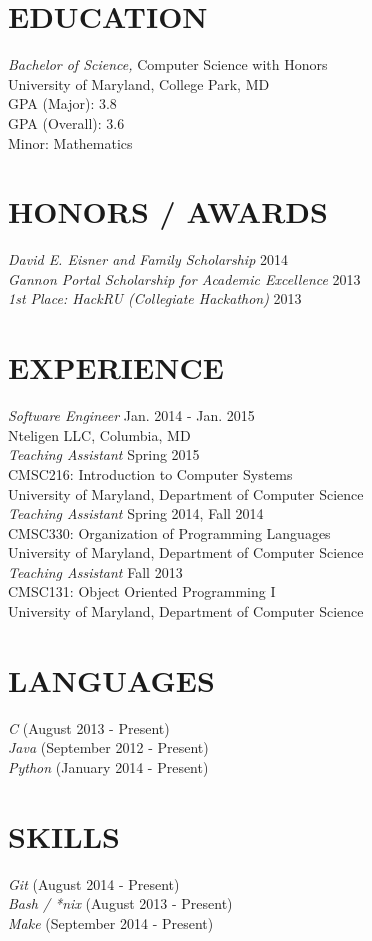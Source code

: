 \documentclass[margin]{res}
\begin{document}
\begin{resume}

\section{EDUCATION} {\sl Bachelor of Science,} Computer Science with Honors\\
	University of Maryland, College Park, MD \\
	GPA (Major): 3.8 \\
	GPA (Overall): 3.6 \\
	Minor: Mathematics \\
 
\section{HONORS / AWARDS} {\sl David E. Eisner and Family Scholarship } \hfill 2014 \\
	{\sl Gannon Portal Scholarship for Academic Excellence} \hfill 2013 \\
	{\sl 1st Place: HackRU (Collegiate Hackathon)} \hfill 2013 \\
 
\section{EXPERIENCE} {\sl Software Engineer} \hfill Jan. 2014 - Jan. 2015 \\
	Nteligen LLC, Columbia, MD \\
	
	{\sl Teaching Assistant } \hfill Spring 2015 \\
	CMSC216: Introduction to Computer Systems \\
	University of Maryland, Department of Computer Science \\
	
	{\sl Teaching Assistant } \hfill Spring 2014, Fall 2014 \\
	CMSC330: Organization of Programming Languages \\
	University of Maryland, Department of Computer Science \\
	
	{\sl Teaching Assistant } \hfill Fall 2013 \\
	CMSC131: Object Oriented Programming I \\
	University of Maryland, Department of Computer Science \\ 
	
\section{LANGUAGES} {\sl C }\hfill (August 2013 - Present) \\
	{\sl Java } \hfill (September 2012 - Present) \\
	{\sl Python } \hfill (January 2014 - Present) \\
	
\section{SKILLS} {\sl Git } \hfill (August 2014 - Present) \\
	{\sl Bash / *nix } \hfill (August 2013 - Present) \\
	{\sl Make } \hfill (September 2014 - Present)

\end{resume}
\end{document}
